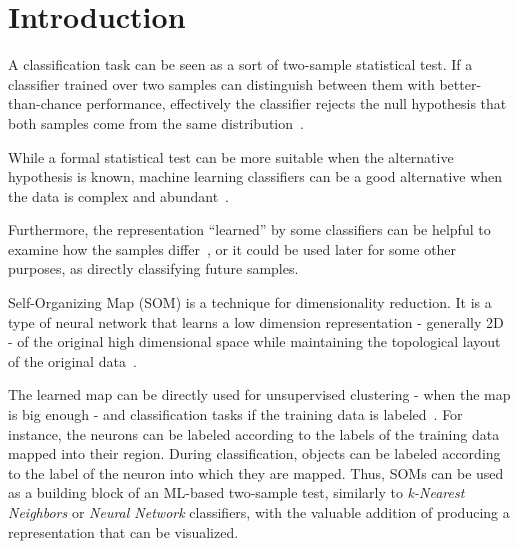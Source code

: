 \section{Introduction}

A classification task can be seen as a sort of two-sample statistical test. If a classifier
trained over two samples can distinguish between them with better-than-chance performance,
effectively the classifier rejects the null hypothesis that both samples come from the
same distribution~\cite{friedman2004multivariate}.

While a formal statistical test can be more suitable when the alternative
hypothesis is known, machine learning classifiers can be a good alternative
when the data is complex and
abundant~\cite{kirchler2020two,kim2021classification,pmlr-v119-liu20m}.

Furthermore, the representation ``learned'' by some classifiers can be helpful to
examine how the samples differ~\cite{friedman2004multivariate,lopez2016revisiting}, or it
could be used later for some other purposes, as directly classifying future samples.

\medskip

Self-Organizing Map (SOM) is a technique for dimensionality
reduction. It is a type of neural network that learns a low dimension representation
- generally 2D - of the original high dimensional space while maintaining the topological
layout of the original data~\cite{kohonen1982self,Villmann1999}.

The learned map can be directly used for unsupervised clustering - when the map is big enough -
and classification tasks if the training data is labeled~\cite{ultsch2005esom,ultsch2007emergence}.
For instance, the neurons can be labeled according to the labels of the training data mapped into
their region. During classification, objects can be labeled according to the label of the neuron
into which they are mapped.
Thus, SOMs can be used as a building block of an ML-based two-sample test, similarly to
\emph{k-Nearest Neighbors} or \emph{Neural Network} classifiers, with the valuable addition
of producing a representation that can be visualized.

